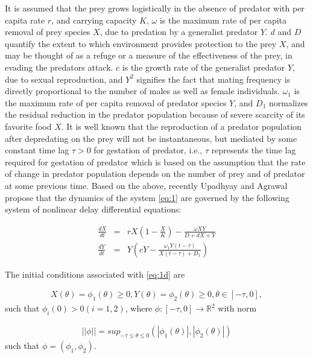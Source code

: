 \documentclass[10pt]{amsart}
\theoremstyle{definition}
\begin{document}
It is assumed that the prey grows logistically in the absence of predator with per capita rate $r$, and carrying capacity $K$, $\omega$ is the maximum rate of per capita removal of prey species $X$, due to predation by a generalist predator $Y$. $d$ and $D$ quantify the extent to which environment provides protection to the prey $X$, and may be thought of as a refuge or a measure of the effectiveness of the prey, in evading the predators attack. $c$ is the growth rate of the generalist predator $Y$, due to sexual reproduction, and $Y^2$ signifies the fact that mating frequency is directly proportional to the number of males as well as female individuals. $\omega_{1}$ is the maximum rate of per capita removal of predator species $Y$, and $D_{1}$ normalizes the residual reduction in the predator population because of severe scarcity of its favorite food $X$.
It is well known that the reproduction of a predator population after depredating on the prey will not be instantaneous, but mediated by some constant time lag $\tau> 0$ for gestation of predator, i.e., $\tau$ represents the time lag required for gestation of predator which is based on the assumption that the rate of change in predator population depends on the number of prey and of predator at some previous time. Based on the above, recently Upadhyay and Agrawal \cite{RK15}  propose that the dynamics of the system \eqref{eq:1} are governed by the following system of nonlinear delay differential equations:

\begin{eqnarray}
\label{eq:1d}
\frac{dX}{dt}&=&rX(1-\frac{X}{K})-\frac{\omega XY}{D+dX+Y} \nonumber \\
\frac{dY}{dt}&=& Y\left(cY-\frac{\omega_{1}Y(t-\tau)}{X(t-\tau)+D_{1}}\right)
\end{eqnarray}

The initial conditions associated with \eqref{eq:1d} are 

\begin{eqnarray}
X(\theta)=\phi_{1}(\theta) \geq 0, Y(\theta)= \phi_{2}(\theta) \geq 0, \theta \in [-\tau, 0],
\end{eqnarray}
such that $\phi_{i}(0) >0 (i=1,2)$,
where $\phi : [-\tau,0] \longrightarrow \mathbb{R}^{2}$ with norm 

\begin{eqnarray}
||\phi|| = sup_{-\tau \leq \theta \leq 0} (|\phi_{1}(\theta)|,|\phi_{2}(\theta)|) 
\end{eqnarray}
such that $\phi=(\phi_{1},\phi_{2})$.
\end{document}
